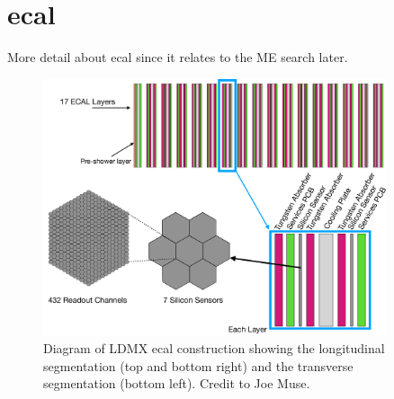 \section{\gls{ecal}}
\label{sec:ldmx:ecal}

More detail about \gls{ecal} since it relates to the ME search later.

\begin{figure}
    \centering
    \includegraphics[width=0.9\textwidth]{figures/ldmx/experiment/ecal.pdf}
    \caption{
        Diagram of LDMX \gls{ecal} construction showing the longitudinal segmentation
        (top and bottom right) and the transverse segmentation (bottom left).
        Credit to Joe Muse.
    }
    \label{fig:ldmx-ecal}
\end{figure}
